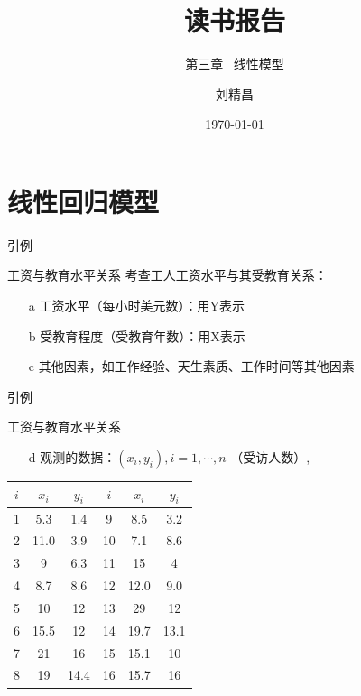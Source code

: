 \documentclass[xetex,mathserif,serif]{beamer}
\begin{document}
\title[机器学习读书会报告] %
{读书报告}
\subtitle{第三章 \ 线性模型}
\author{刘精昌 } %
\date{\today}
\subject{读书会}

\begin{frame}
\titlepage
\end{frame}

\section{线性回归模型}

\begin{frame}{引例}
  \begin{block}{工资与教育水平关系}
    考查工人工资水平与其受教育关系：
    \begin{itemize}
      \item[a] 工资水平（每小时美元数）：用Y表示
      \item[b] 受教育程度（受教育年数）：用X表示
      \item[c] 其他因素，如工作经验、天生素质、工作时间等其他因素
    \end{itemize}
  \end{block}
\end{frame}

\begin{frame}{引例}
    \begin{block}{工资与教育水平关系}
    \begin{itemize}
      \item[d] 观测的数据：$\left(x_i,y_i\right),i=1,\cdots,n$ （受访人数）,
    \end{itemize}
    \end{block}

    \begin{center}
    \begin{tabular}{c||c c|c||c c}
      \hline
      $i$ & $x_i$ & $y_i$ & $i$ & $x_i$ & $y_i$ \\
      \hline
      1 & 5.3 & 1.4 & 9 & 8.5 & 3.2 \\
      2 & 11.0 & 3.9 & 10 & 7.1 & 8.6 \\
      3 & 9 & 6.3 & 11 & 15 & 4 \\
      4 & 8.7 & 8.6 & 12 & 12.0 & 9.0 \\
      5 & 10 & 12 & 13 & 29 & 12 \\
      6 & 15.5 & 12 & 14 & 19.7 & 13.1 \\
      7 & 21 & 16 & 15 & 15.1 & 10 \\
      8 & 19 & 14.4 & 16 & 15.7 & 16 \\
      \hline
    \end{tabular}
    \end{center}

\end{frame}
\end{document}
